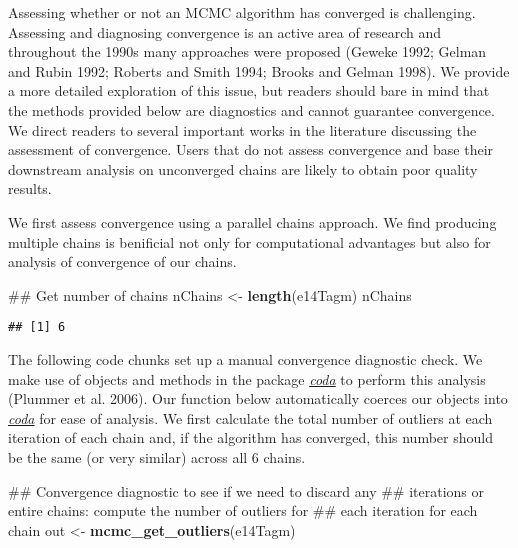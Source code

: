 \documentclass[]{article}
\newenvironment{Shaded}{\begin{snugshade}}{\end{snugshade}}
\newcommand{\KeywordTok}[1]{\textcolor[rgb]{0.13,0.29,0.53}{\textbf{{#1}}}}
\newcommand{\StringTok}[1]{\textcolor[rgb]{0.31,0.60,0.02}{{#1}}}
\newcommand{\NormalTok}[1]{{#1}}
\begin{document}
Assessing whether or not an MCMC algorithm has converged is challenging.
Assessing and diagnosing convergence is an active area of research and
throughout the 1990s many approaches were proposed (Geweke 1992; Gelman
and Rubin 1992; Roberts and Smith 1994; Brooks and Gelman 1998). We
provide a more detailed exploration of this issue, but readers should
bare in mind that the methods provided below are diagnostics and cannot
guarantee convergence. We direct readers to several important works in
the literature discussing the assessment of convergence. Users that do
not assess convergence and base their downstream analysis on unconverged
chains are likely to obtain poor quality results.

We first assess convergence using a parallel chains approach. We find
producing multiple chains is benificial not only for computational
advantages but also for analysis of convergence of our chains.

\begin{Shaded}
\begin{Highlighting}[]
\NormalTok{## Get number of chains}
\NormalTok{nChains <-}\StringTok{ }\KeywordTok{length}\NormalTok{(e14Tagm)}
\NormalTok{nChains}
\end{Highlighting}
\end{Shaded}

\begin{verbatim}
## [1] 6
\end{verbatim}

The following code chunks set up a manual convergence diagnostic check.
We make use of objects and methods in the package
\emph{\href{https://CRAN.R-project.org/package=coda}{coda}} to perform
this analysis (Plummer et al. 2006). Our function below automatically
coerces our objects into
\emph{\href{https://CRAN.R-project.org/package=coda}{coda}} for ease of
analysis. We first calculate the total number of outliers at each
iteration of each chain and, if the algorithm has converged, this number
should be the same (or very similar) across all 6 chains.

\begin{Shaded}
\begin{Highlighting}[]
\NormalTok{## Convergence diagnostic to see if we need to discard any}
\NormalTok{## iterations or entire chains: compute the number of outliers for}
\NormalTok{## each iteration for each chain}
\NormalTok{out <-}\StringTok{ }\KeywordTok{mcmc_get_outliers}\NormalTok{(e14Tagm)}
\end{Highlighting}
\end{Shaded}
\end{document}
